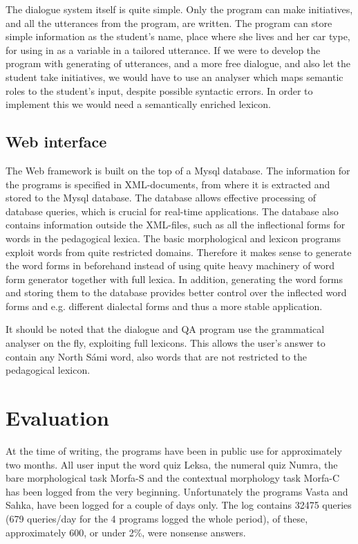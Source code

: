 \documentclass[11pt]{article}
\begin{document}
The dialogue system itself is quite simple. Only the program can make initiatives, and all the utterances from the program, are written. The program can store simple information as the student's name, place where she lives and her car type, for using in as a variable in a tailored utterance. If we were to develop the program with generating of utterances, and a more free dialogue, and also let the student take initiatives, we would have to use an analyser which maps semantic roles to the student's input, despite possible syntactic errors. In order to implement this we would need a semantically enriched lexicon.

\subsection{Web interface}

The Web framework is built on the top of a Mysql database. The information for the programs is specified in XML-documents, from where it is extracted and stored to the Mysql database. The database allows effective processing of database queries, which is crucial for real-time applications. The database also contains information outside the XML-files, such as all the inflectional forms for words in the pedagogical lexica. The basic morphological and lexicon programs exploit words from quite restricted domains. Therefore it makes sense to generate the word forms in beforehand instead of using quite heavy machinery of word form generator together with full lexica. In addition, generating the word forms and storing them to the database provides better control over the inflected word forms and e.g. different dialectal forms and thus a more stable application.

It should be noted that the dialogue and QA program use the grammatical analyser on the fly, exploiting full lexicons. This allows the user's answer to contain any North Sámi word, also words that are not restricted to the pedagogical lexicon.

\section{Evaluation}

At the time of writing, the programs have been in public use for approximately two months. %
All user input the word quiz Leksa, the numeral quiz Numra, the bare morphological task Morfa-S and the contextual morphology task Morfa-C has been logged from the very beginning. Unfortunately the programs Vasta and Sahka, have been logged for a couple of days only. The log contains 32475 queries (679 queries/day for the 4 programs logged the whole period), of these, approximately 600, or under 2\%, were nonsense answers. 
\end{document}
